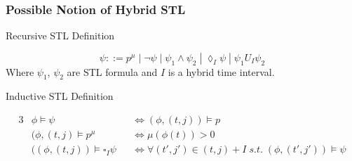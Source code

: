 \documentclass{article}
\theoremstyle{definition}
\newtheorem{definition}{Definition}[section]
\begin{document}

\clearpage


\subsubsection{Possible Notion of Hybrid STL}
\begin{center}
    Recursive STL Definition
\end{center}
\begin{equation}
    \psi ::= p^\mu\;|\;\lnot \psi\;|\;\psi_1 \land \psi_2\;|\;\lozenge_{I} \psi\;|\;\psi_1 U_{I} \psi_2
\end{equation}
Where $\psi_1$, $\psi_2$ are STL formula and $I$ is a hybrid time interval.

\begin{center}
    Inductive STL Definition
\end{center}
\begin{alignat*}{3}
            &\phi \models \psi &&\Leftrightarrow (\phi, (t,j)) \models p \\
            &(\phi, (t,j) \models p^\mu \quad &&\Leftrightarrow \mu(\phi(t))
> 0\\
            &((\phi,(t,j)) \models \square_{I} \psi &&\Leftrightarrow \forall (t',j') \in (t,j)+I\;s.t.\;(\phi, (t',j')) \models \psi
\end{alignat*}
\end{document}
